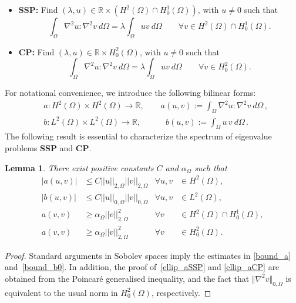 \documentclass[final,reqno]{elsarticle}
\newtheorem{lemma}{Lemma}[section]
\def\O{\Omega}
\begin{document}
\begin{itemize}
    \item {\bf SSP:} Find $(\lambda,u)\in  \mathbb{R}\times \left(H^2(\Omega)\cap H_0^1(\Omega)\right)$, with $u\neq 0$ such that
\begin{equation}
    \int_{\Omega}\nabla^2 u: \nabla^2 v\ d\Omega=\lambda \int_{\Omega} u v\ d\Omega\qquad \forall v\in H^2(\Omega)\cap H_0^1(\Omega).\label{WForSSP}
\end{equation}
%
%
    \item {\bf CP:} Find $(\lambda,u)\in  \mathbb{R}\times H_0^2(\Omega)$, with $u\neq 0$ such that
\begin{equation}
    \int_{\Omega}\nabla^2 u: \nabla^2 v\ d\Omega=\lambda \int_{\Omega} u v\ d\Omega\qquad \forall v\in H_0^2(\Omega).\label{WForCP}
\end{equation}
\end{itemize}
For notational convenience, we introduce the following bilinear forms:
\begin{align}
	&a: H^2(\Omega)\times H^2(\Omega)  \to \mathbb{R},\qquad a(u,v):=\int_{\Omega}\nabla^2 u: \nabla^2 v\ d\Omega\,,\label{def_aD}\\
	&b:L^2(\Omega)\times L^2(\Omega)\to \mathbb{R},\qquad \quad b(u,v):=\int_{\Omega}u\,v\ d\Omega\,.\label{def_b0}
\end{align}
The following result is essential to characterize the spectrum of eigenvalue problems {\bf SSP} and {\bf CP}.
\begin{lemma}\label{Bound_Elli}
There exist positive constants $C$ and $\alpha_{\Omega}$ such that
\begin{align}
|a(u,v)|&\leq C||u||_{2,\Omega}||v||_{2,\Omega} 
&\forall u,v&\in H^2(\Omega),\label{bound_a}
\\
|b(u,v)|&\leq C||u||_{0,\Omega}||v||_{0,\Omega}
&\forall u,v&\in L^2(\Omega),\label{bound_b0}\\
a(v,v) &\geq \alpha_{\Omega}  ||v||_{2,\Omega}^2
&\forall v&\in  H^2(\Omega)\cap H_0^1(\Omega),\label{ellip_aSSP}\\
a(v,v) &\geq \alpha_{\Omega}  ||v||_{2,\Omega}^2
&\forall v&\in  H_0^2(\Omega)\label{ellip_aCP}.
\end{align}
\end{lemma}

\begin{proof}
Standard arguments in Sobolev spaces imply the estimates in \eqref{bound_a}   and~\eqref{bound_b0}. In addition, the proof of~\eqref{ellip_aSSP} and \eqref{ellip_aCP} are obtained from the Poincar\'e generalised inequality, and the fact that $\Vert \nabla^2 v\Vert_{0,\O}$ is equivalent to the usual norm in $H_0^2(\Omega)$, respectively.
\end{proof}
\end{document}
